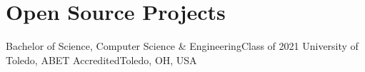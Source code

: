 \section{Open Source Projects}
\mySubHeadingListStart

  \mySubHeading
    {Bachelor of Science, Computer Science \& Engineering}{Class of 2021}
    {University of Toledo, ABET Accredited}{Toledo, OH, USA}
    \myItemListStart
    \myItemListEnd

\mySubHeadingListEnd
